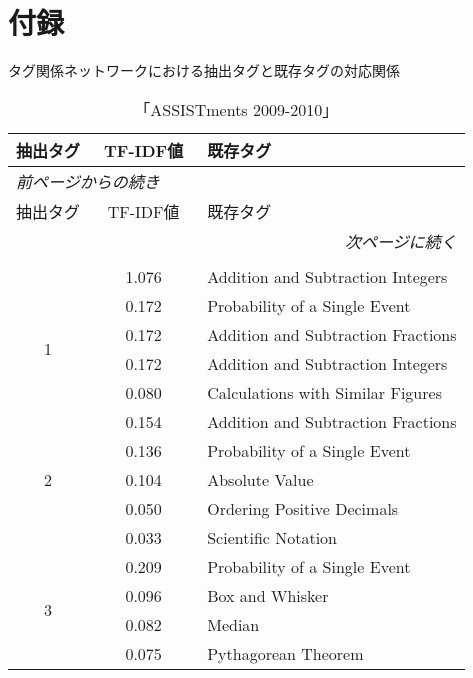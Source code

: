 \chapter*{付録}
\label{chap:appendix}
\fancyhf{}
\rhead{\thepage}
\cfoot{\thepage}


タグ関係ネットワークにおける抽出タグと既存タグの対応関係

\setcounter{LTchunksize}{10}

\begin{longtable}[c]{|c|c|l|}
\caption{「ASSISTments 2009-2010」}
\label{tab:result1}
\\
\hline
抽出タグ &  TF-IDF値　& 既存タグ\\
\hline
\hline
\endfirsthead
\multicolumn{3}{l}{\small\it 前ページからの続き}\\
\hline
抽出タグ &  TF-IDF値　& 既存タグ\\
\hline
\hline
\endhead
\hline
\multicolumn{3}{r}{\small\it 次ページに続く}\\
\endfoot
\hline
\multicolumn{3}{r}{\small\it 以上}\\
\endlastfoot
\multirow{1}{*}{0} & 1.076 & Addition and Subtraction Integers \\
\hline
\multirow{4}{*}{1} & 0.172 & Probability of a Single Event \\
 & 0.172 & Addition and Subtraction Fractions \\
 & 0.172 & Addition and Subtraction Integers \\
 & 0.080 & Calculations with Similar Figures \\
\hline
\multirow{5}{*}{2} & 0.154 & Addition and Subtraction Fractions \\
 & 0.136 & Probability of a Single Event \\
 & 0.104 & Absolute Value \\
 & 0.050 & Ordering Positive Decimals \\
 & 0.033 & Scientific Notation \\
\hline
\multirow{6}{*}{3} & 0.209 & Probability of a Single Event \\
 & 0.096 & Box and Whisker \\
 & 0.082 & Median \\
 & 0.075 & Pythagorean Theorem \\

\end{longtable}
